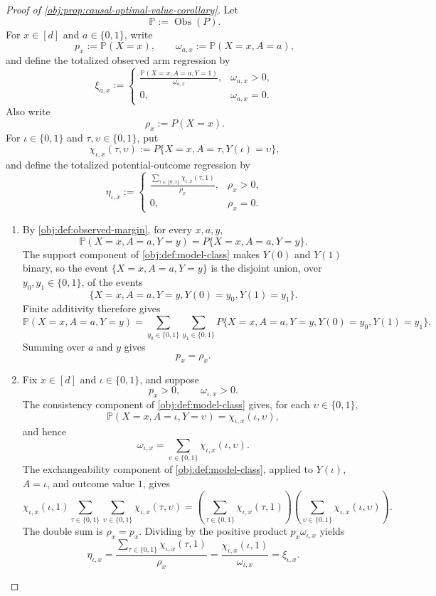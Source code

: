\begin{proof}[Proof of \cref{obj:prop:causal-optimal-value-corollary}]
Let
\[
\mathbb P:=\operatorname{Obs}(P).
\]
For \(x\in[d]\) and \(a\in\{0,1\}\), write
\[
p_x:=\mathbb P(X=x),
\qquad
\omega_{a,x}:=\mathbb P(X=x,A=a),
\]
and define the totalized observed arm regression by
\[
\xi_{a,x}:=
\begin{cases}
\displaystyle
\frac{\mathbb P(X=x,A=a,Y=1)}{\omega_{a,x}},
& \omega_{a,x}>0,\\[1.2ex]
0,& \omega_{a,x}=0.
\end{cases}
\]
Also write
\[
\rho_x:=P(X=x).
\]
For \(\iota\in\{0,1\}\) and \(\tau,\upsilon\in\{0,1\}\), put
\[
\chi_{\iota,x}(\tau,\upsilon)
:=
P\{X=x,A=\tau,Y(\iota)=\upsilon\},
\]
and define the totalized potential-outcome regression by
\[
\eta_{\iota,x}:=
\begin{cases}
\displaystyle
\frac{\sum_{\tau\in\{0,1\}}\chi_{\iota,x}(\tau,1)}{\rho_x},
& \rho_x>0,\\[1.2ex]
0,& \rho_x=0.
\end{cases}
\]

\begin{enumerate}
\item By \cref{obj:def:observed-margin}, for every \(x,a,y\),
\[
\mathbb P(X=x,A=a,Y=y)
=
P\{X=x,A=a,Y=y\}.
\]
The support component of \cref{obj:def:model-class} makes \(Y(0)\) and \(Y(1)\) binary, so the event \(\{X=x,A=a,Y=y\}\) is the disjoint union, over \(y_0,y_1\in\{0,1\}\), of the events
\[
\{X=x,A=a,Y=y,Y(0)=y_0,Y(1)=y_1\}.
\]
Finite additivity therefore gives
\[
\mathbb P(X=x,A=a,Y=y)
=
\sum_{y_0\in\{0,1\}}\sum_{y_1\in\{0,1\}}
P\{X=x,A=a,Y=y,Y(0)=y_0,Y(1)=y_1\}.
\]
Summing over \(a\) and \(y\) gives
\[
p_x=\rho_x .
\]

\item Fix \(x\in[d]\) and \(\iota\in\{0,1\}\), and suppose
\[
p_x>0,
\qquad
\omega_{\iota,x}>0.
\]
The consistency component of \cref{obj:def:model-class} gives, for each \(\upsilon\in\{0,1\}\),
\[
\mathbb P(X=x,A=\iota,Y=\upsilon)
=
\chi_{\iota,x}(\iota,\upsilon),
\]
and hence
\[
\omega_{\iota,x}
=
\sum_{\upsilon\in\{0,1\}}\chi_{\iota,x}(\iota,\upsilon).
\]
The exchangeability component of \cref{obj:def:model-class}, applied to \(Y(\iota)\), \(A=\iota\), and outcome value \(1\), gives
\[
\chi_{\iota,x}(\iota,1)
\sum_{\tau\in\{0,1\}}\sum_{\upsilon\in\{0,1\}}
\chi_{\iota,x}(\tau,\upsilon)
=
\left(\sum_{\tau\in\{0,1\}}\chi_{\iota,x}(\tau,1)\right)
\left(\sum_{\upsilon\in\{0,1\}}\chi_{\iota,x}(\iota,\upsilon)\right).
\]
The double sum is \(\rho_x=p_x\).  Dividing by the positive product
\(p_x\omega_{\iota,x}\) yields
\[
\eta_{\iota,x}
=
\frac{\sum_{\tau\in\{0,1\}}\chi_{\iota,x}(\tau,1)}{\rho_x}
=
\frac{\chi_{\iota,x}(\iota,1)}{\omega_{\iota,x}}
=
\xi_{\iota,x}.
\]


\end{enumerate}
\end{proof}
